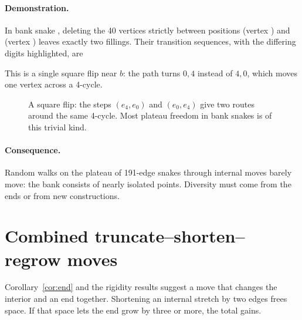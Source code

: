 \documentclass[11pt,a4paper]{article}
\theoremstyle{definition}
\begin{document}
\paragraph{Demonstration.} In bank snake \WinSnake, deleting the 40 vertices strictly between positions \WinI{} (vertex \WinA) and \WinJ{} (vertex \WinB) leaves exactly two fillings. Their transition sequences, with the \WinDiff{} differing digits highlighted, are
\begin{center}\small

\end{center}
This is a single square flip near $b$: the path turns $0,4$ instead of $4,0$, which moves one vertex across a 4-cycle.

\begin{figure}[ht]
\centering
{}
\caption{A square flip: the steps $(e_4,e_0)$ and $(e_0,e_4)$ give two routes around the same 4-cycle. Most plateau freedom in bank snakes is of this trivial kind.}
\end{figure}

\paragraph{Consequence.} Random walks on the plateau of 191-edge snakes through internal moves barely move: the bank consists of nearly isolated points. Diversity must come from the ends or from new constructions.

\section{Combined truncate--shorten--regrow moves}\label{sec:combo}

Corollary~\ref{cor:end} and the rigidity results suggest a move that changes the interior and an end together. Shortening an internal stretch by two edges frees space. If that space lets the end grow by three or more, the total gains.
\end{document}
